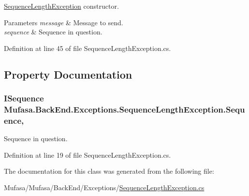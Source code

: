 \hyperlink{class_mufasa_1_1_back_end_1_1_exceptions_1_1_sequence_length_exception}{Sequence\+Length\+Exception} constructor. 


\begin{DoxyParams}{Parameters}
{\em message} & Message to send.\\
\hline
{\em sequence} & Sequence in question.\\
\hline
\end{DoxyParams}


Definition at line 45 of file Sequence\+Length\+Exception.\+cs.



\subsection{Property Documentation}
\hypertarget{class_mufasa_1_1_back_end_1_1_exceptions_1_1_sequence_length_exception_ace577fe27718b807b7468270750aef00}{
\subsubsection[{Sequence}]{\setlength{\rightskip}{0pt plus 5cm}I\+Sequence Mufasa.\+Back\+End.\+Exceptions.\+Sequence\+Length\+Exception.\+Sequence\hspace{0.3cm}{\ttfamily [get]}, {\ttfamily [set]}}}\label{class_mufasa_1_1_back_end_1_1_exceptions_1_1_sequence_length_exception_ace577fe27718b807b7468270750aef00}


Sequence in question. 



Definition at line 19 of file Sequence\+Length\+Exception.\+cs.



The documentation for this class was generated from the following file\+:\begin{DoxyCompactItemize}
\item 
Mufasa/\+Mufasa/\+Back\+End/\+Exceptions/\hyperlink{_sequence_length_exception_8cs}{Sequence\+Length\+Exception.\+cs}\end{DoxyCompactItemize}
